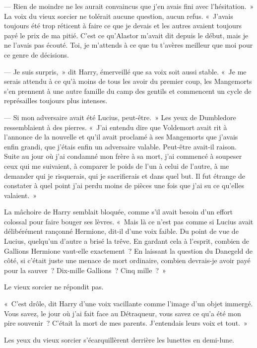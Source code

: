 --- Rien de moindre ne les aurait convaincus que j'en avais fini avec l'hésitation.~»
La voix du vieux sorcier ne tolérait aucune question, aucun refus.
«~J'avais toujours été trop réticent à faire ce que je devais et les autres avaient toujours payé le prix de ma pitié.
C'est ce qu'Alastor m'avait dit depuis le début, mais je ne l'avais pas écouté.
Toi, je m'attends à ce que tu t'avères meilleur que moi pour ce genre de décisions.

--- Je suis surpris,~» dit Harry, émerveillé que sa voix soit aussi stable.
«~Je me serais attendu à ce qu'à moins de tous les avoir du premier coup, les Mangemorts s'en prennent à une autre famille du camp des gentils et commencent un cycle de représailles toujours plus intenses.

--- Si mon adversaire avait été Lucius, peut-être.~»
Les yeux de Dumbledore ressemblaient à des pierres.
«~J'ai entendu dire que Voldemort avait rit à l'annonce de la nouvelle et qu'il avait proclamé à ses Mangemorts que j'avais enfin grandi, que j'étais enfin un adversaire valable.
Peut-être avait-il raison.
Suite au jour où j'ai condamné mon frère à sa mort, j'ai commencé à soupeser ceux qui me suivaient, à comparer le poids de l'un à celui de l'autre, à me demander qui je risquerais, qui je sacrifierais et dans quel but.
Il fut étrange de constater à quel point j'ai perdu moins de pièces une fois que j'ai su ce qu'elles valaient.~»

La mâchoire de Harry semblait bloquée, comme s'il avait besoin d'un effort colossal pour faire bouger ses lèvres.
«~Mais là ce n'est pas comme si Lucius avait délibérément rançonné Hermione, dit-il d'une voix faible.
Du point de vue de Lucius, quelqu'un d'autre a brisé la trêve.
En gardant cela à l'esprit, combien de Gallions Hermione vaut-elle exactement~?
En laissant la question du Danegeld de côté, si c'était juste une menace de mort ordinaire, combien devrais-je avoir payé pour la sauver~?
Dix-mille Gallions~?
Cinq mille~?~»

Le vieux sorcier ne répondit pas.

«~C'est drôle, dit Harry d'une voix vacillante comme l'image d'un objet immergé.
Vous savez, le jour où j'ai fait face au Détraqueur, vous savez ce qu'a été mon pire souvenir~?
C'était la mort de mes parents.
J'entendais leurs voix et tout.~»

Les yeux du vieux sorcier s'écarquillèrent derrière les lunettes en demi-lune.


